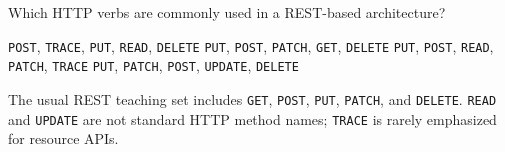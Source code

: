 \question[4]
Which HTTP verbs are commonly used in a REST-based architecture?
\begin{choices}
  \choice \texttt{POST}, \texttt{TRACE}, \texttt{PUT}, \texttt{READ}, \texttt{DELETE}
  \CorrectChoice \texttt{PUT}, \texttt{POST}, \texttt{PATCH}, \texttt{GET}, \texttt{DELETE}
  \choice \texttt{PUT}, \texttt{POST}, \texttt{READ}, \texttt{PATCH}, \texttt{TRACE}
  \choice \texttt{PUT}, \texttt{PATCH}, \texttt{POST}, \texttt{UPDATE}, \texttt{DELETE}
\end{choices}
\begin{solution}
  The usual REST teaching set includes \texttt{GET}, \texttt{POST}, \texttt{PUT}, \texttt{PATCH}, and \texttt{DELETE}. \texttt{READ} and \texttt{UPDATE} are not standard HTTP method names; \texttt{TRACE} is rarely emphasized for resource APIs.
\end{solution}


\newpage



